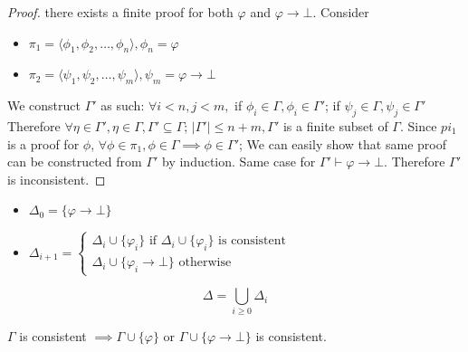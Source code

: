 \documentclass{article}
\newtheorem{definition}[theorem]{Definition}
\let\olddefinition\definition
\let\endolddefinition\enddefinition
\renewenvironment{definition}
  {\begin{tcolorbox}[
      colback=red!10,
      colframe=red!50!black,
      boxrule=0.6pt,
      arc=2pt,
      left=6pt,right=6pt,top=4pt,bottom=4pt,
      breakable
    ]\olddefinition}
  {\endolddefinition\end{tcolorbox}}
\newtheorem{lemma}[theorem]{Lemma}
\let\oldlemma\lemma
\let\endoldlemma\endlemma
\renewenvironment{lemma}
  {\begin{tcolorbox}[
      colback=green!8,
      colframe=green!50!black,
      boxrule=0.6pt,
      arc=2pt,
      left=6pt,right=6pt,top=4pt,bottom=4pt
    ]\oldlemma}
  {\endoldlemma\end{tcolorbox}}
\begin{document}
\begin{itemize}
\begin{proof}
        there exists a finite proof for both $\varphi$ and $\varphi \rightarrow \bot$. Consider 
        \begin{itemize}
            \item $\pi_1 = \langle\phi_1, \phi_2, \dots, \phi_n\rangle, \phi_n = \varphi$
            \item $\pi_2 = \langle\psi_1, \psi_2, \dots, \psi_m\rangle, \psi_m = \varphi \rightarrow \bot$
        \end{itemize}
        We construct $\Gamma'$ as such: $\forall i < n, j < m, $ if $\phi_i \in \Gamma, \phi_i \in \Gamma'$; if $\psi_j \in \Gamma, \psi_j \in \Gamma'$ 
        Therefore $\forall \eta \in \Gamma', \eta \in \Gamma, \Gamma' \subseteq \Gamma$; $|\Gamma'| \leq n + m, \Gamma'$ is a finite subset of $\Gamma$.
        Since $pi_1$ is a proof for $\phi$, $\forall \phi \in \pi_1, \phi \in \Gamma \implies \phi \in \Gamma'$; We can easily show that same proof can be 
        constructed from $\Gamma'$ by induction. Same case for $\Gamma'\vdash \varphi \rightarrow \bot$. Therefore $\Gamma'$ is inconsistent.       
    \end{proof}
\end{itemize}
\begin{definition}
    \begin{itemize}
        \item $\Delta_0 = \{\varphi \rightarrow \bot\}$
        \item $\Delta_{i+1} = \begin{cases}
            \Delta_i \cup \{\varphi_i\} \text{ if } \Delta_i \cup \{\varphi_i\} \text{ is consistent}\\
            \Delta_i \cup \{\varphi_i \rightarrow \bot\} \text{ otherwise}
        \end{cases}$
    \end{itemize}
    \[\Delta = \bigcup_{i\geq 0} \Delta_i\]
\end{definition}
\begin{lemma}
    $\Gamma$ is consistent $\implies \Gamma \cup \{\varphi\}$ or $\Gamma \cup \{\varphi \rightarrow \bot\}$ is consistent.
\end{lemma}
\end{document}
